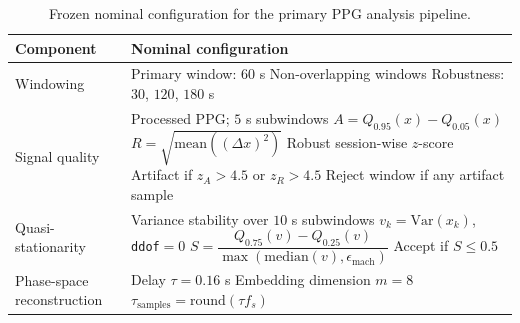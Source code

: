 \begin{table}[t]
    \centering
    \caption{Frozen nominal configuration for the primary PPG analysis pipeline.}
    \label{tab:analysis_configuration}
    \footnotesize
    \setlength{\tabcolsep}{4pt}
    \renewcommand{\arraystretch}{1.08}

    \begin{tabularx}{\columnwidth}{p{} X}
        \toprule
        \textbf{Component} & \textbf{Nominal configuration} \\
        \midrule

        Windowing
        &
        \makecell[l]{
        Primary window: $60$ s \\
        Non-overlapping windows \\
        Robustness: $30$, $120$, $180$ s
        }
        \\

        \midrule

        Signal quality
        &
        \makecell[l]{
        Processed PPG; $5$ s subwindows \\
        $A=Q_{0.95}(x)-Q_{0.05}(x)$ \\
        $R=\sqrt{\mathrm{mean}((\Delta x)^2)}$ \\
        Robust session-wise $z$-score \\
        Artifact if $z_A>4.5$ or $z_R>4.5$ \\
        Reject window if any artifact sample
        }
        \\

        \midrule

        Quasi-stationarity
        &
        \makecell[l]{
        Variance stability over $10$ s subwindows \\
        $v_k=\mathrm{Var}(x_k)$, \texttt{ddof}$=0$ \\
        $S=\dfrac{Q_{0.75}(v)-Q_{0.25}(v)}
        {\max(\mathrm{median}(v),\epsilon_{\mathrm{mach}})}$ \\
        Accept if $S\leq0.5$
        }
        \\

        \midrule

        Phase-space reconstruction
        &
        \makecell[l]{
        Delay $\tau=0.16$ s \\
        Embedding dimension $m=8$ \\
        $\tau_{\mathrm{samples}}=\mathrm{round}(\tau f_s)$
        }
        \\


\end{tabularx}
\end{table}
